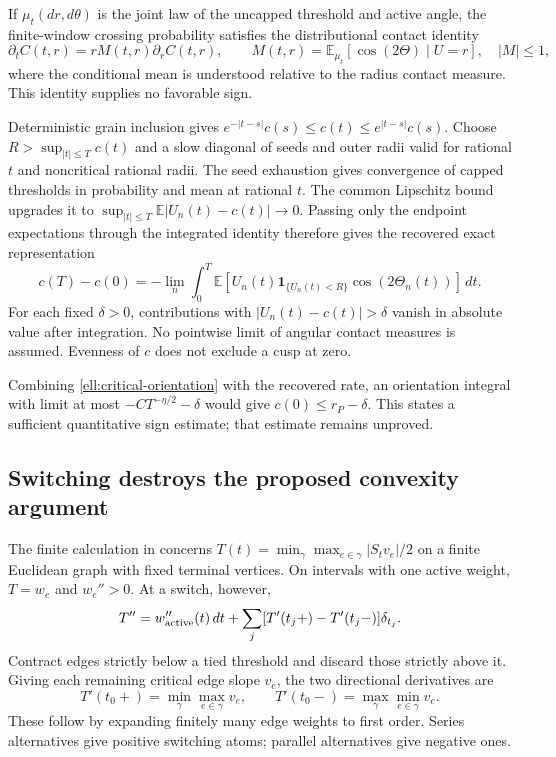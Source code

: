 \documentclass[11pt,a4paper]{article}
\theoremstyle{definition}
\theoremstyle{remark}
\numberwithin{equation}{section}
\begin{document}
If $\mu_t(dr,d\theta)$ is the joint law of the uncapped threshold
and active angle, the finite-window crossing probability satisfies
the distributional contact identity
\[
 \partial_t C(t,r)=rM(t,r)\partial_r C(t,r),\qquad
 M(t,r)=\mathbb E_{\mu_t}[\cos(2\Theta)\mid U=r],\quad |M|\le1,
\]
where the conditional mean is understood relative to the radius
contact measure. This identity supplies no favorable sign.

Deterministic grain inclusion gives
$e^{-|t-s|}c(s)\le c(t)\le e^{|t-s|}c(s)$.
Choose $R>\sup_{|t|\le T}c(t)$ and a slow diagonal of seeds and
outer radii valid for rational $t$ and noncritical rational radii.
The seed exhaustion gives convergence of capped thresholds in
probability and mean at rational $t$. The common Lipschitz bound
upgrades it to
$\sup_{|t|\le T}\mathbb E|U_n(t)-c(t)|\to0$.
Passing only the endpoint expectations through the integrated identity
therefore gives the recovered exact representation
\begin{equation}\label{ell:critical-orientation}
 c(T)-c(0)=-\lim_n\int_0^T
 \mathbb E[U_n(t)\mathbf1_{\{U_n(t)<R\}}
                         \cos(2\Theta_n(t))]\,dt.
\end{equation}
For each fixed $\delta>0$, contributions with
$|U_n(t)-c(t)|>\delta$ vanish in absolute value after integration.
No pointwise limit of angular contact measures is assumed.
Evenness of $c$ does not exclude a cusp at zero.

Combining \eqref{ell:critical-orientation} with the recovered rate,
an orientation integral with limit at most
$-CT^{-\eta/2}-\delta$ would give $c(0)\le r_P-\delta$.
This states a sufficient quantitative sign estimate; that estimate
remains unproved.

\subsection{Switching destroys the proposed convexity argument}
\label{ell:switching}

The finite calculation in  concerns
$T(t)=\min_\gamma\max_{e\in\gamma}|S_tv_e|/2$ on a finite Euclidean
graph with fixed terminal vertices. On intervals with one active
weight, $T=w_e$ and $w_e''>0$. At a switch, however,
\[
 T''=w_{\rm active}''(t)\,dt+
       \sum_j[T'(t_j+)-T'(t_j-)]\delta_{t_j}.
\]
Contract edges strictly below a tied threshold and discard those
strictly above it. Giving each remaining critical edge slope $v_e$,
the two directional derivatives are
\[
 T'(t_0+)=\min_\gamma\max_{e\in\gamma}v_e,\qquad
 T'(t_0-)=\max_\gamma\min_{e\in\gamma}v_e.
\]
These follow by expanding finitely many edge weights to first order.
Series alternatives give positive switching atoms; parallel
alternatives give negative ones.
\end{document}
